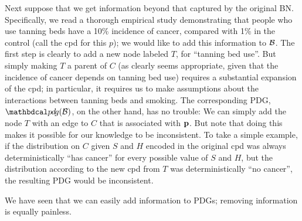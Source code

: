 \documentclass[the-pdg-manual.tex]{subfiles}
\begin{document}
\begin{example}[emulating a BN]
Next suppose that we get information beyond that captured by the original BN.
Specifically, we read a thorough empirical study demonstrating that people who
use tanning beds have a 10\% incidence of cancer, compared with 1\% in the
control (call the cpd for this $p$); we would like to add this information to
$\cal B$. The first step is clearly to add a new node labeled $T$, for ``tanning
bed use''.  But simply making $T$ a parent of $C$ (as clearly seems appropriate,
given that the incidence of cancer depends on tanning bed use) requires a
substantial expansion of the cpd; in particular, it requires us to make
assumptions about the interactions between tanning beds and smoking.  
%
The corresponding PDG, $\PDGof{{\mathcal B}}$, on the other hand, has no
trouble: We can simply add the node $T$ with an edge to $C$ that is associated
with $\mathbf p$.  But note that doing this makes it possible for our knowledge to
be inconsistent. To take a simple example, if the distribution on $C$ given $S$
and $H$ encoded in the original cpd was always deterministically ``has cancer''
for every possible value of $S$ and $H$, but the distribution according to the
new cpd from $T$ was deterministically ``no cancer'', the resulting PDG would be
inconsistent.  
%
\end{example}


We have seen that we can easily add information to PDGs; removing information is
equally painless.   
\end{document}
